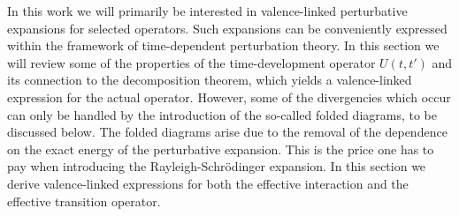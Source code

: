



In this work we will primarily be interested in valence-linked
perturbative expansions for selected operators. Such expansions
can be conveniently expressed within the framework of time-dependent
perturbation theory. In this section we will review some of the
properties of the time-development operator $U(t,t')$ and its
connection to the decomposition theorem, which yields a
valence-linked expression for the actual operator. However, some
of the divergencies which occur can only be handled by the
introduction of the so-called folded diagrams, to be
discussed below. The folded diagrams
arise due to the removal of the dependence on the exact
energy of the perturbative expansion. This is the price one has
to pay when introducing the Rayleigh-Schr\"{o}dinger expansion.
In this section we derive valence-linked expressions for both
the effective interaction and the effective transition operator.

